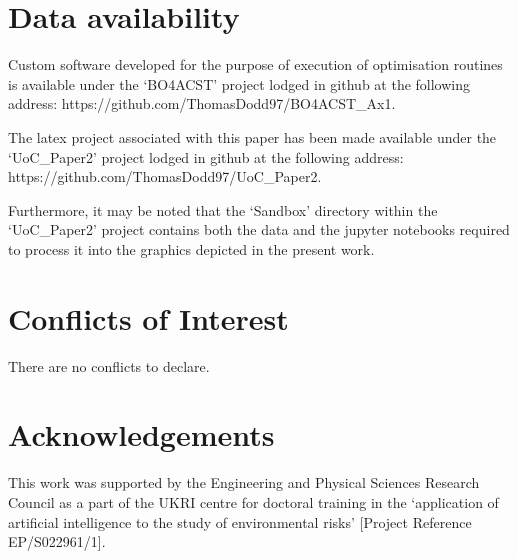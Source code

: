 \section{Data availability}
Custom software developed for the purpose of execution of optimisation
 routines is available under the `BO4ACST' project lodged in github at
 the following address: https://github.com/ThomasDodd97/BO4ACST\_Ax1.

The latex project associated with this paper has been made available
 under the `UoC\_Paper2' project lodged in github at the following 
 address: https://github.com/ThomasDodd97/UoC\_Paper2.

Furthermore, it may be noted that the `Sandbox' directory within the
 `UoC\_Paper2' project contains both the data and the jupyter notebooks
 required to process it into the graphics depicted in the present work.

\section{Conflicts of Interest}
There are no conflicts to declare.

\section{Acknowledgements}
This work was supported by the Engineering and Physical Sciences Research
Council as a part of the UKRI centre for doctoral training in the `application
of artificial intelligence to the study of environmental risks' [Project Reference
EP/S022961/1].